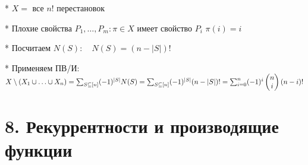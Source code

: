 \documentclass[12pt]{article}
\begin{document}
\begin{itemize}
        * $X = $ все $n!$ перестановок

        * Плохие свойства $P_1,\dots,P_m : \pi \in X$ имеет свойство $P_i$ \Longleftrightarrow $\pi(i) = i$

        * Посчитаем $N(S): \quad N(S) = (n - |S|)!$

        * Применяем ПВ/И: $X \setminus (X_1 \union \dots \union X_n) = \sum_{S \subseteq [n]} (-1)^{|S|} N(S) =
        \sum_{S \subseteq [n]} (-1)^{|S|} (n - |S|)! = \sum_{i = 0}^n (-1)^{i} \begin{pmatrix}
                                                                                   n \\ i
        \end{pmatrix} (n - i)!$

    \end{itemize}

    \clearpage


    \section{8. Рекуррентности и производящие функции}
\end{document}
